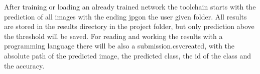 \documentclass[../ImageClassifier.tex]{subfiles}
\begin{document}
    After training or loading an already trained network the toolchain starts with the prediction of all images with the ending \flqq jpg\frqq on the user given folder.
    All results are stored in the results directory in the project folder, but only prediction above the threshold will be saved.
    For reading and working the results with a programming language there will be also a \flqq submission.csv\frqq created, with the absolute path of the predicted image, the predicted class, the id of the class and the accuracy.
\end{document}
